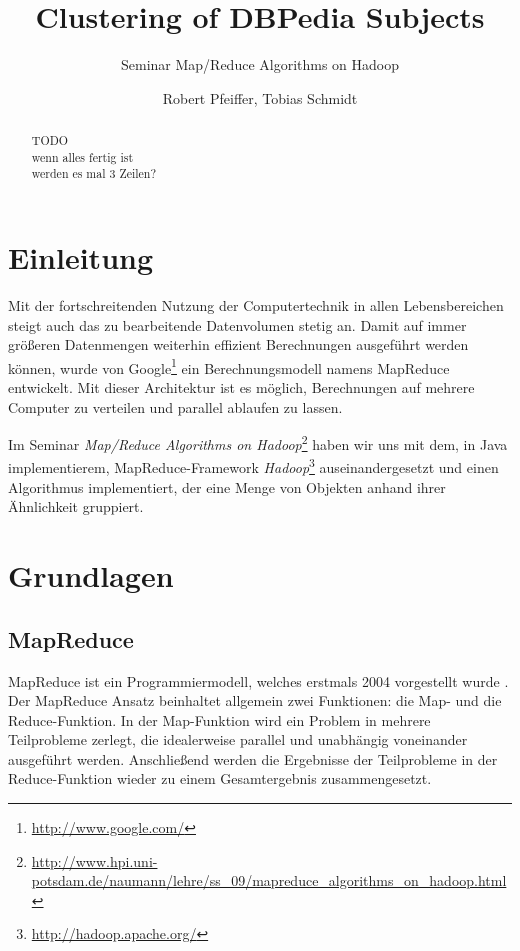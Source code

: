 \documentclass[a4paper]{llncs}
\begin{document}
\title{Clustering of DBPedia Subjects}
\subtitle{Seminar Map/Reduce Algorithms on Hadoop}
\author{Robert Pfeiffer, Tobias Schmidt}

\maketitle

\begin{abstract}
TODO\\
wenn alles fertig ist\\
werden es mal 3 Zeilen?
\end{abstract}

\section{Einleitung}
Mit der fortschreitenden Nutzung der Computertechnik in allen Lebensbereichen steigt auch das zu bearbeitende Datenvolumen stetig an. Damit auf immer größeren Datenmengen weiterhin effizient Berechnungen ausgeführt werden können, wurde von Google\footnote{\url{http://www.google.com/}} ein Berechnungsmodell namens MapReduce entwickelt. Mit dieser Architektur ist es möglich, Berechnungen auf mehrere Computer zu verteilen und parallel ablaufen zu lassen.

Im Seminar \emph{Map/Reduce Algorithms on Hadoop}\footnote{\url{http://www.hpi.uni-potsdam.de/naumann/lehre/ss_09/mapreduce_algorithms_on_hadoop.html}} haben wir uns mit dem, in Java implementierem, MapReduce-Framework \emph{Hadoop}\footnote{\url{http://hadoop.apache.org/}} auseinandergesetzt und einen Algorithmus implementiert, der eine Menge von Objekten anhand ihrer Ähnlichkeit gruppiert.

\section{Grundlagen}

\subsection{MapReduce}
MapReduce ist ein Programmiermodell, welches erstmals 2004 vorgestellt wurde \cite{DG04}.
Der MapReduce Ansatz beinhaltet allgemein zwei Funktionen: die Map- und die Reduce-Funktion. In der Map-Funktion wird ein Problem in mehrere Teilprobleme zerlegt, die idealerweise parallel und unabhängig voneinander ausgeführt werden.
Anschließend werden die Ergebnisse der Teilprobleme in der Reduce-Funktion wieder zu einem Gesamtergebnis zusammengesetzt.
\end{document}
